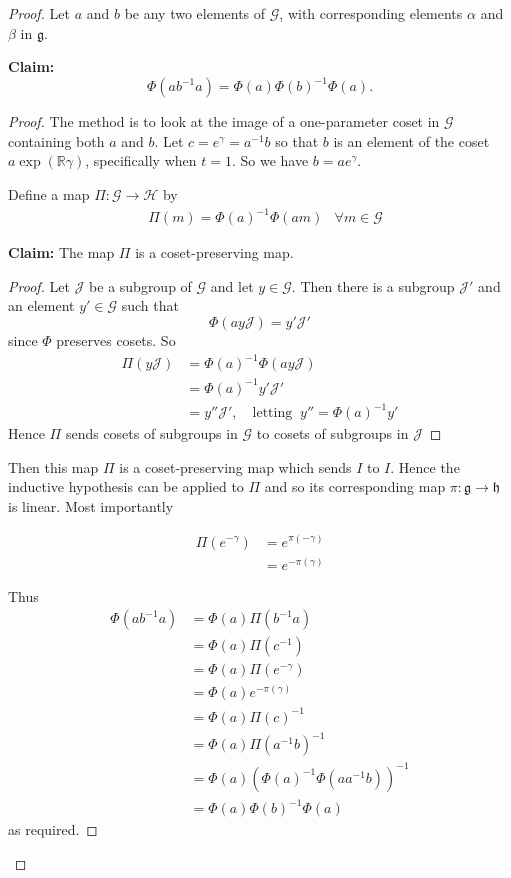 \documentclass[honours]{UNSWthesis}
\newcommand{\R}{\mathbb{R}}
\newcommand{\G}{\mathcal{G}}
\newcommand{\g}{\mathfrak{g}}
\newcommand{\1}{\mathbf{e}_{1}}
\newcommand{\2}{\mathbf{e}_{3}}
\newcommand{\3}{\mathbf{e}_{3}}
\begin{document}
\begin{proof}
Let $a$ and $b$ be any two elements of $\G$, with corresponding elements $\alpha$ and $\beta$ in $\g$. 

\textbf{Claim:} 
\[
\Phi(ab^{-1}a)=\Phi(a)\Phi(b)^{-1}\Phi(a).
\]
\begin{proof}

The method is to look at the image of a one-parameter coset in $\G$ containing both $a$ and $b$. 
Let $c=e^{\gamma}=a^{-1}b$ so that $b$ is an element of the coset $a\exp(\R\gamma)$, specifically when $t=1$. 
So we have $b=ae^{\gamma}$.

Define a map $ \Pi:\G \longrightarrow \mathcal{H} $ by 
\begin{align*}
&\Pi(m)=\Phi(a)^{-1}\Phi(am) & \forall m \in \G
\end{align*}

\textbf{Claim:}
The map $\Pi$ is a coset-preserving map.

\begin{proof}
Let $\mathcal{J}$ be a subgroup of $\G$ and let $y \in \G$. Then there is a subgroup $\mathcal{J}'$ and an element $y' \in \G$ such that 
\[
\Phi(ay\mathcal{J}) = y'\mathcal{J}'
\]
since $\Phi$ preserves cosets. 
So 
\begin{align*}
\Pi(y\mathcal{J}) &= \Phi(a)^{-1} \Phi(ay\mathcal{J}) \\
&= \Phi(a)^{-1}y'\mathcal{J}' \\
&= y''\mathcal{J}',\quad \text{letting}\;\; y''=\Phi(a)^{-1}y'
\end{align*}
Hence $\Pi$ sends cosets of subgroups in $\G$ to cosets of subgroups in $\mathcal{J}$ 
\end{proof}

Then this map $\Pi$ is a coset-preserving map which sends $I$ to $I$. Hence the inductive hypothesis can be applied to $\Pi$ and so its corresponding map $\pi: \g \longrightarrow \mathfrak{h}$ is linear.
Most importantly 

\begin{align*}
\Pi(e^{-\gamma}) &= e^{\pi(-\gamma)} \\
&= e^{-\pi(\gamma)}
\end{align*}

Thus 
\begin{align*}
\Phi(ab^{-1}a) &= \Phi(a)\Pi(b^{-1}a)\\
&= \Phi(a)\Pi(c^{-1})\\
&= \Phi(a) \Pi(e^{-\gamma}) \\
&= \Phi(a) e^{-\pi(\gamma)} \\
&= \Phi(a) \Pi(c)^{-1} \\
&= \Phi(a) \Pi(a^{-1}b)^{-1} \\
&= \Phi(a) (\Phi(a)^{-1}\Phi(aa^{-1}b))^{-1} \\
&= \Phi(a) \Phi(b)^{-1} \Phi(a)
\end{align*}
as required. 


\end{proof}
\end{proof}
\end{document}
